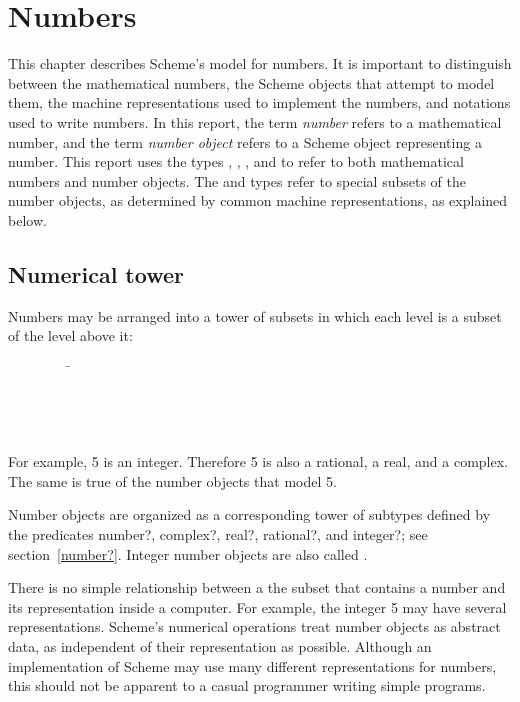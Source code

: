 \chapter{Numbers}
\label{numbertypeschapter}

This chapter describes Scheme's model for numbers.  It is important to
distinguish between the mathematical numbers, the Scheme objects that
attempt to model them, the machine representations used to implement
the numbers, and notations used to write numbers.  In this report, the
term \textit{number} refers to a mathematical number, and the term
\textit{number object} refers to a Scheme object representing a
number.  This report uses the types , ,
, and  to refer to both mathematical
numbers and number objects.  The  and  types
refer to special subsets of the number objects, as determined by
common machine representations, as explained below.

\section{Numerical tower}
\label{numericaltypes}

Numbers may be arranged into a tower of subsets in which each level
is a subset of the level above it:
\begin{tabbing}
\ \ \ \ \ \ \ \ \ \= \\
\>  \\
\>  \\
\>  \\
\>  
\end{tabbing}

For example, 5 is an integer.  Therefore 5 is also a rational,
a real, and a complex.  The same is true of the number objects
that model 5.  

Number objects are organized as a corresponding tower of subtypes
defined by the predicates {\cf number?}, {\cf complex?}, {\cf real?},
{\cf rational?}, and {\cf integer?}; see section~\ref{number?}.
Integer number objects are also called .

There is no simple relationship between a the subset that contains a
number and its representation inside a computer.  For example, the
integer 5 may have several representations.  Scheme's numerical
operations treat number objects as abstract data, as independent of
their representation as possible.  Although an implementation of
Scheme may use many different representations for numbers, this should
not be apparent to a casual programmer writing simple programs.

